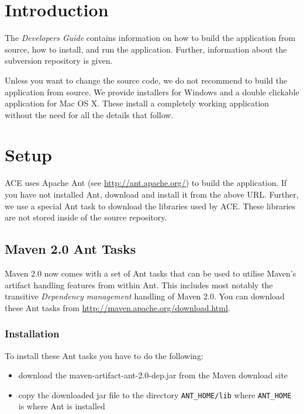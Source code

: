 \documentclass[11pt,a4paper]{article}
\begin{document}


\tableofcontents


\section{Introduction}

The \emph{Developers Guide} contains information on how to build the application
from source, how to install, and run the application. Further, information
about the subversion repository is given.

Unless you want to change the source code, we do not recommend to build the
application from source. We provide installers for Windows and a double
clickable application for Mac OS X. These install a completely working
application without the need for all the details that follow.


\section{Setup}
ACE uses Apache Ant (see \href{http://ant.apache.org/}{http://ant.apache.org/})
to build the application. If you have not installed Ant, download and install
it from the above URL. Further, we use a special Ant task to download the
libraries used by ACE. These libraries are not stored inside of the source
repository.

\subsection{Maven 2.0 Ant Tasks}
Maven 2.0 now comes with a set of Ant tasks that can be used to utilise Maven's
artifact handling features from within Ant. This includes most notably the
transitive \emph{Dependency management} handling of Maven 2.0. You can
download these Ant tasks from 
\href{http://maven.apache.org/download.html}{http://maven.apache.org/download.html}.

\subsubsection{Installation}
To install these Ant tasks you have to do the following:
\begin{itemize}
 \item download the maven-artifact-ant-2.0-dep.jar from the Maven download site
 \item copy the downloaded jar file to the directory \texttt{ANT_HOME/lib} where \texttt{ANT_HOME} is where Ant is installed
\end{itemize}
\end{document}
